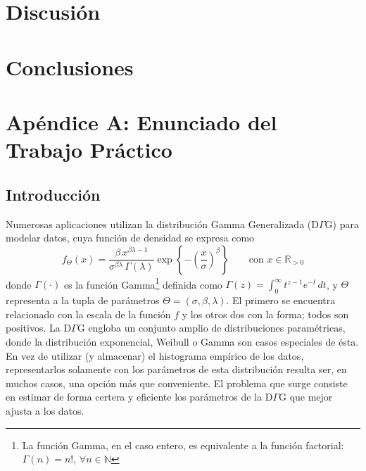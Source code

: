 \documentclass[a4paper,10pt,twoside]{article}
\begin{document}


\section{Discusión}

\blindtext




\section{Conclusiones}

\blindtext




\section{Apéndice A: Enunciado del Trabajo Práctico}

\newcommand{\real}{\mathbb{R}}
\newcommand{\nat}{\mathbb{N}}
\newcommand{\eme}{\mathcal{M}}
\newcommand{\emeh}{\widehat{\mathcal{M}}}
\newcommand{\ere}{\mathcal{R}}

\subsection{Introducci\'on}

Numerosas aplicaciones utilizan la distribuci\'on Gamma Generalizada (D$\Gamma$G) para modelar datos, cuya funci\'on de densidad se expresa como $$f_\Theta(x)=\frac{\beta\, x^{\beta \lambda - 1}}{\sigma^{\beta \lambda}\, \Gamma(\lambda)} \exp\left\{-\left(\frac{x}{\sigma} \right)^\beta \right\}\qquad\textrm{con } x\in\real_{>0}$$ donde 
$\Gamma(\cdot)$ es la funci\'on Gamma\footnote{La funci\'on Gamma, en el caso entero, es equivalente a la funci\'on factorial: $\Gamma(n)=n!$, $\forall n\in\nat$ } definida como $\Gamma(z)=\int_0^{\infty}{t^{z-1}e^{-t}\,dt}$, y $\Theta$ representa a la tupla de par\'ametros $\Theta=(\sigma,\beta,\lambda)$. El primero se encuentra relacionado con la escala de la funci\'on $f$ y los otros dos con la forma; todos son positivos.
La D$\Gamma$G engloba un conjunto amplio de distribuciones param\'etricas, donde la distribuci\'on exponencial, Weibull o Gamma son casos especiales de \'esta.
En vez de utilizar (y almacenar) el histograma emp\'irico de los datos, representarlos solamente con los par\'ametros de esta distribuci\'on resulta ser, en muchos casos, una opci\'on m\'as que conveniente. El problema que surge consiste en estimar de forma certera y eficiente los par\'ametros de la D$\Gamma$G que mejor ajusta a los datos.
\end{document}
